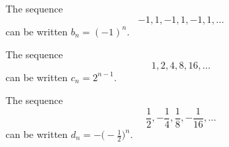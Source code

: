 \begin{frame}
\begin{example}
The sequence 
\[
-1, 1, -1, 1, -1, 1, \ldots
\]
can be written $b_n = (-1)^n$.  
\end{example}

\begin{example}
The sequence 
\[
1,2,4,8,16,\ldots
\]
can be written $c_n = 2^{n-1}$.  
\end{example}

\begin{example}
The sequence 
\[
\frac{1}{2}, -\frac{1}{4},\frac{1}{8},-\frac{1}{16},\ldots
\]
can be written $d_n = -\big( -\frac{1}{2}\big)^n$.  
\end{example}

\end{frame}
